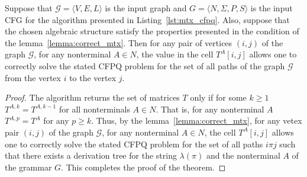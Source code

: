 \begin{theorem}\label{thm:correct_mtx}
	Suppose that $\mathcal{G} = \langle V, E, L \rangle$ is the input graph and $G =\langle N, \Sigma, P, S \rangle$ is the input CFG for the algorithm presented in Listing~\ref{lst:mtx_cfpq}. Also, suppose that the chosen algebraic structure satisfy the properties presented in the condition of the lemma~\ref{lemma:correct_mtx}. Then for any pair of vertices $(i, j)$ of the graph $\mathcal{G}$, for any nonterminal $A \in N$, the value in the cell $T^{A}[i, j]$ allows one to correctly solve the stated CFPQ problem for the set of all paths of the graph $\mathcal{G}$ from the vertex $i$ to the vertex $j$.
\end{theorem}
\begin{proof}
The algorithm returns the set of matrices $T$ only if for some $k \geq 1$ $T^{A, k} = T^{A, k - 1}$ for all nonterminals $A \in N$. That is, for any nonterminal $A$ $T^{A, p} = T^{A}$ for any $p \geq k$. Thus, by the lemma~\ref{lemma:correct_mtx}, for any vetex pair $(i, j)$ of the graph $\mathcal{G}$, for any nonterminal $A \in N$, the cell $T^{A}[i, j]$ allows one to correctly solve the stated CFPQ problem for the set of all paths $i \pi j$ such that there exists a derivation tree for the string $\lambda(\pi)$ and the nonterminal $A$ of the grammar $G$. This completes the proof of the theorem.
\end{proof}

